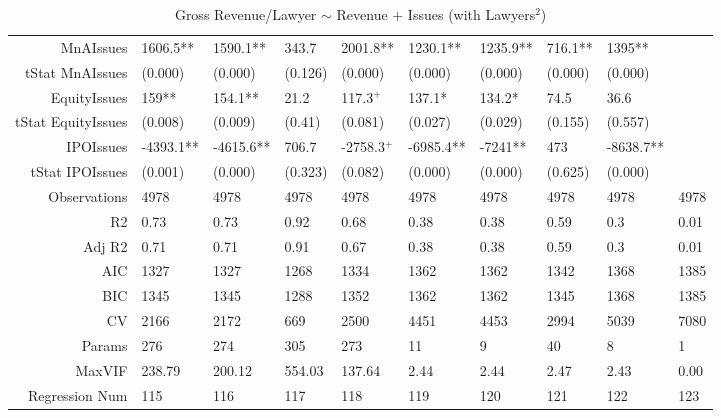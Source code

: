 \begin{table}[ht]
\begin{tabular}{rlllllllll}
  MnAIssues & 1606.5** & 1590.1** & 343.7 & 2001.8** & 1230.1** & 1235.9** & 716.1** & 1395** &  \\ 
  tStat MnAIssues & (0.000) & (0.000) & (0.126) & (0.000) & (0.000) & (0.000) & (0.000) & (0.000) &  \\ 
  EquityIssues & 159** & 154.1** & 21.2 & 117.3$^{+}$ & 137.1* & 134.2* & 74.5 & 36.6 &  \\ 
  tStat EquityIssues & (0.008) & (0.009) & (0.41) & (0.081) & (0.027) & (0.029) & (0.155) & (0.557) &  \\ 
  IPOIssues & -4393.1** & -4615.6** & 706.7 & -2758.3$^{+}$ & -6985.4** & -7241** & 473 & -8638.7** &  \\ 
  tStat IPOIssues & (0.001) & (0.000) & (0.323) & (0.082) & (0.000) & (0.000) & (0.625) & (0.000) &  \\ 
  Observations & 4978 & 4978 & 4978 & 4978 & 4978 & 4978 & 4978 & 4978 & 4978 \\ 
  R2 & 0.73 & 0.73 & 0.92 & 0.68 & 0.38 & 0.38 & 0.59 & 0.3 & 0.01 \\ 
  Adj R2 & 0.71 & 0.71 & 0.91 & 0.67 & 0.38 & 0.38 & 0.59 & 0.3 & 0.01 \\ 
  AIC & 1327 & 1327 & 1268 & 1334 & 1362 & 1362 & 1342 & 1368 & 1385 \\ 
  BIC & 1345 & 1345 & 1288 & 1352 & 1362 & 1362 & 1345 & 1368 & 1385 \\ 
  CV & 2166 & 2172 & 669 & 2500 & 4451 & 4453 & 2994 & 5039 & 7080 \\ 
  Params & 276 & 274 & 305 & 273 & 11 & 9 & 40 & 8 & 1 \\ 
  MaxVIF & 238.79 & 200.12 & 554.03 & 137.64 & 2.44 & 2.44 & 2.47 & 2.43 & 0.00 \\ 
  Regression Num & 115 & 116 & 117 & 118 & 119 & 120 & 121 & 122 & 123 \\ 
   \hline
\end{tabular}
\caption{Gross Revenue/Lawyer $\sim$ Revenue + Issues (with Lawyers$^2$)} 
\end{table}
